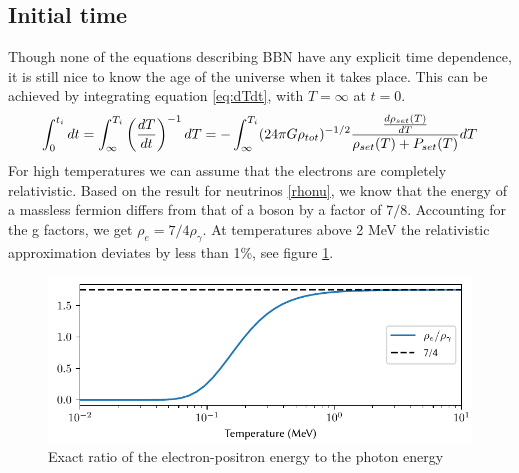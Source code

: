\subsection{Initial time}
\label{sec:t_ini}
Though none of the equations describing BBN have any explicit time dependence, it is still nice to know the age of the universe when it takes place. This can be achieved by integrating equation \eqref{eq:dTdt}, with $T=\infty$ at $t=0$.
\begin{align}
    \int_{0}^{t_i}dt=\int_{\infty}^{T_i}\left(\frac{dT}{dt}\right)^{-1}dT=-\int_{\infty}^{T_i}(24\pi G\rho_{tot})^{-1/2}\frac{\frac{d\rho_{set}(T)}{dT}}{\rho_{set}(T) + P_{set}(T)}dT
    \label{eq:ti_integral}
\end{align}
For high temperatures we can assume that the electrons are completely relativistic. Based on the result for neutrinos \eqref{rhonu}, we know that the energy of a massless fermion differs from that of a boson by a factor of $7/8$. Accounting for the g factors, we get $\rho_e=7/4 \rho_\gamma$. At temperatures above 2 MeV the relativistic approximation deviates by less than 1\%, see figure \ref{fig:rhoegammaT}.
\begin{figure}[ht]
    \includegraphics[width=5.1in]{figures/rhoegammaT.pdf}
    \caption{Exact ratio of the electron-positron energy to the photon energy}
    \label{fig:rhoegammaT}
\end{figure}


